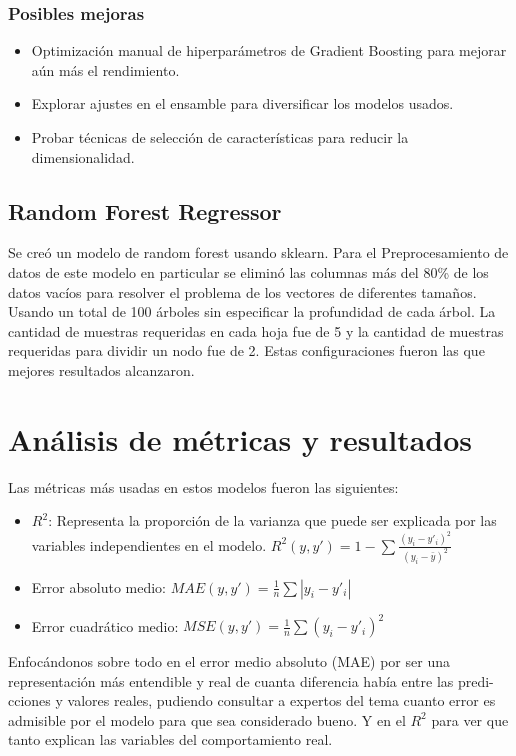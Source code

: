 \documentclass{article}
\begin{document}
\subsubsection{Posibles mejoras}
\begin{itemize}
    \item Optimización manual de hiperparámetros de Gradient Boosting para mejorar aún más el rendimiento.
    \item Explorar ajustes en el ensamble para diversificar los modelos usados.
    \item Probar técnicas de selección de características para reducir la dimensionalidad.
\end{itemize}

\subsection{Random Forest Regressor}
Se creó un modelo de random forest usando sklearn. Para el Preprocesamiento de datos de este modelo en particular se eliminó las columnas más del 80\% de los datos
vacíos para resolver el problema de los vectores de diferentes tamaños. Usando un total de 100 árboles sin especificar la profundidad de cada árbol. La cantidad de
muestras requeridas en cada hoja fue de 5 y la cantidad de muestras requeridas para dividir un nodo fue de 2. Estas configuraciones fueron las que mejores resultados
alcanzaron.


\newpage

\section{Análisis de métricas y resultados}
Las métricas más usadas en estos modelos fueron las siguientes:
\begin{itemize}
    \item \(R^2\): Representa la proporción de la varianza que puede ser explicada por las variables independientes en el modelo.
          \(R^2(y,y')= 1 - \sum\frac{(y_i-y'_i)^2}{(y_i- \bar{y})^2 }\)
    \item Error absoluto medio: \(MAE(y,y')= \frac{1}{n} \sum |y_i-y'_i|\)
    \item Error cuadrático medio: \(MSE(y,y')= \frac{1}{n} \sum (y_i-y'_i)^2\)
\end{itemize}

Enfocándonos sobre todo en el error medio absoluto (MAE) por ser una representación más entendible y real de cuanta diferencia había
entre las predi-cciones y valores reales, pudiendo consultar a expertos del tema cuanto error es admisible por el modelo para que sea
considerado bueno. Y en el \(R^2\) para ver que tanto explican las variables del comportamiento real.
\end{document}
